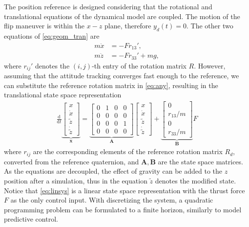 The position reference is designed considering that the rotational and translational equations of the dynamical model are coupled. The motion of the flip maneuver is within the $x-z$ plane, therefore $y_d(t) = 0$. The other two equations of \eqref{eq:geom_tran} are
\begin{subequations}\label{eq:any}
    \begin{align}
       m \ddot x & = - Fr_{13}',\\
        m \ddot{z} & = - F r_{33}' + mg,  
    \end{align}
\end{subequations}
where $r_{ij}'$ denotes the $(i, j)$-th entry of the rotation matrix $R$. However, assuming that the attitude tracking converges fast enough to the reference, we can substitute the reference rotation matrix in \eqref{eq:any}, resulting in the translational state space representation
    \begin{align}\label{eq:linsys}
    \frac{\mathrm{d}}{\mathrm{d}t} \underbrace{\begin{bmatrix} x \\ \dot x \\ \tilde z \\ \dot{\tilde{z}}\end{bmatrix}}_{\mathbf{x}} = \underbrace{\begin{bmatrix} 0 & 1 & 0 & 0 \\ 0 & 0 & 0 & 0 \\ 0 & 0 & 0 & 1 \\ 0 & 0 & 0 & 0 \end{bmatrix}}_{\mathbf{A}} \begin{bmatrix} x \\ \dot x \\ \tilde z \\ \dot{\tilde{z}} \end{bmatrix} + \underbrace{\begin{bmatrix} 0 \\ r_{13}/m \\ 0 \\ r_{33}/m \end{bmatrix}}_{\mathbf{B}}  F
    \end{align}
where $r_{ij}$ are the corresponding elements of the reference rotation matrix $R_d$, converted from the reference quaternion, and $\mathbf A, \mathbf B$ are the state space matrices. As the equations are decoupled, the effect of gravity can be added to the $z$ position after a simulation, thus in the equation $\tilde{z}$ denotes the modified state. Notice that \eqref{eq:linsys} is a linear state space representation with the thrust force $F$ as the only control input. With discretizing the system, a quadratic programming problem can be formulated to a finite horizon, similarly to model predictive control.

